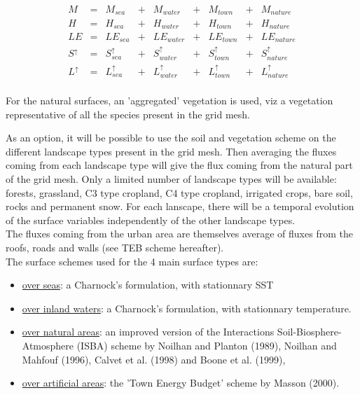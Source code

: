 \begin{displaymath}
\begin{array}{lclclclcl}
M &= & M_{sea} & + & M_{water} & + & M_{town} & + & M_{nature} \\
H &= & H_{sea} & + & H_{water} & + & H_{town} & + & H_{nature} \\
LE &= & LE_{sea} & + & LE_{water} & + & LE_{town} & + & LE_{nature} \\
S^\uparrow &= & S^\uparrow_{sea} & + & S^\uparrow_{water} & + & S^\uparrow_{town} & + & S^\uparrow_{nature} \\
L^\uparrow &= & L^\uparrow_{sea} & + & L^\uparrow_{water} & + & L^\uparrow_{town} & + & L^\uparrow_{nature} \\
\end{array}
\end{displaymath}

\bigskip

For the natural surfaces,
an 'aggregated' vegetation is used, viz
a vegetation representative of all the species present
in the grid mesh.

As an option, it will be possible to use the soil and
vegetation scheme on the different landscape types present in the grid mesh.
Then averaging the fluxes coming from each landscape type will give
the flux coming from the natural part of the grid mesh.
Only a limited number of landscape types will be available:
forests, grassland, C3 type cropland, C4 type cropland, irrigated crops,
bare soil, rocks and permanent snow. For each lanscape,
there will be a temporal
evolution of the surface variables independently of the other landscape types.\\

The fluxes coming from the urban area are themselves average
of fluxes from the roofs, roads and walls (see TEB scheme hereafter).\\




The surface schemes used for the 4 main surface types are:

\begin{itemize}
\item \underline{over seas}: a  Charnock's formulation, with stationnary SST
\item \underline{over inland waters}: a Charnock's formulation, with stationnary
temperature.
\item \underline{over natural areas}:
an improved version of the
Interactions Soil-Biosphere-Atmosphere (ISBA) scheme
by Noilhan and Planton (1989), Noilhan and Mahfouf (1996),
Calvet et al. (1998) and Boone et al. (1999),
\item \underline{over artificial areas}:
the 'Town Energy Budget' scheme by Masson (2000).
\end{itemize}

